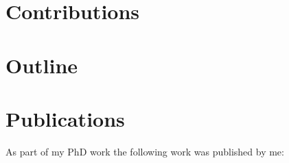 



\section{Contributions} \label{sec:intro:contributions}

\section{Outline} \label{sec:intro:outline}

\section{Publications} \label{sec:intro:pubs}
As part of my PhD work the following work was published by me:
